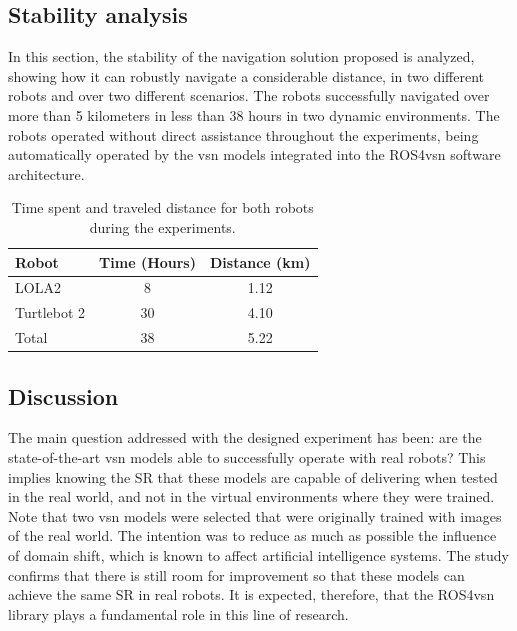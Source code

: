 \subsection{Stability analysis}
\label{subsec:marathon}

In this section, the stability of the navigation solution proposed is analyzed, showing how it can robustly navigate a considerable distance, in two different robots and over two different scenarios.
The robots successfully navigated over more than 5 kilometers in less than 38 hours in two dynamic environments.
The robots operated without direct assistance throughout the experiments, being automatically operated by the \acrshort{vsn} models integrated into the ROS4\acrshort{vsn} software architecture.

\begin{table}
    \centering
    \begin{tabular}{l|cc}
        \toprule
        \textbf{Robot} & Time (Hours) & Distance (km) \\
        \midrule
        LOLA2       & 8     & 1.12 \\
        Turtlebot 2 & 30    & 4.10 \\\midrule
        Total       & 38    & 5.22 \\
        \bottomrule
    \end{tabular}
    \caption{Time spent and traveled distance for both robots during the experiments.}
    \label{tab:stability}
\end{table}

\subsection{Discussion}
\label{subsec:discussion}
The main question addressed with the designed experiment has been: are the state-of-the-art \acrshort{vsn} models able to successfully operate with real robots?
This implies knowing the SR that these models are capable of delivering when tested in the real world, and not in the virtual environments where they were trained.
Note that two \acrshort{vsn} models were selected that were originally trained with images of the real world.
The intention was to reduce as much as possible the influence of domain shift, which is known to affect artificial intelligence systems.
The study confirms that there is still room for improvement so that these models can achieve the same SR in real robots.
It is expected, therefore, that the ROS4\acrshort{vsn} library plays a fundamental role in this line of research.

